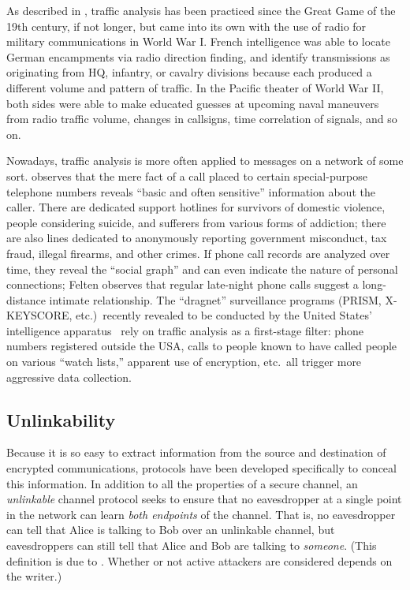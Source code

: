 \documentclass[oneside,tinymargin]{zarticle}
\begin{document}
\begin{multicols}{2}
As described in \textcite{kahn1967codebreakers}, traffic analysis has
been practiced since the Great Game of the 19th century, if not
longer, but came into its own with the use of radio for military
communications in World War I.  French intelligence was able to locate
German encampments via radio direction finding, and identify
transmissions as originating from HQ, infantry, or cavalry divisions
because each produced a different volume and pattern of traffic.  In
the Pacific theater of World War II, both sides were able to make
educated guesses at upcoming naval maneuvers from radio traffic
volume, changes in callsigns, time correlation of signals, and so on.

Nowadays, traffic analysis is more often applied to messages on a
network of some sort.  \textcite{felten2013decl} observes that the
mere fact of a call placed to certain special-purpose telephone
numbers reveals “basic and often sensitive” information about the
caller.  There are dedicated support hotlines for survivors of
domestic violence, people considering suicide, and sufferers from
various forms of addiction; there are also lines dedicated to
anonymously reporting government misconduct, tax fraud, illegal
firearms, and other crimes.  If phone call records are analyzed over
time, they reveal the “social graph” and can even indicate the nature
of personal connections; Felten observes that regular late-night phone
calls suggest a long-distance intimate relationship.  The “dragnet”
surveillance programs (PRISM, X-KEYSCORE, etc.)\ recently revealed to
be conducted by the United States' intelligence
apparatus~\cite{greenwald2013nsa} rely on traffic analysis as a
first-stage filter: phone numbers registered outside the USA, calls to
people known to have called people on various “watch lists,” apparent
use of encryption, etc.\ all trigger more aggressive data collection.

\subsection{Unlinkability}

Because it is so easy to extract information from the source and
destination of encrypted communications, protocols have been developed
specifically to conceal this information.  In addition to all the
properties of a secure channel, an \emph{unlinkable} channel protocol
seeks to ensure that no eavesdropper at a single point in the network
can learn \emph{both endpoints} of the channel.  That is, no
eavesdropper can tell that Alice is talking to Bob over an unlinkable
channel, but eavesdroppers can still tell that Alice and Bob are
talking to \emph{someone}.  (This definition is due to
\textcite{pfitzmann2010terminology}.  Whether or not active
attackers are considered depends on the writer.)


\end{multicols}
\end{document}
